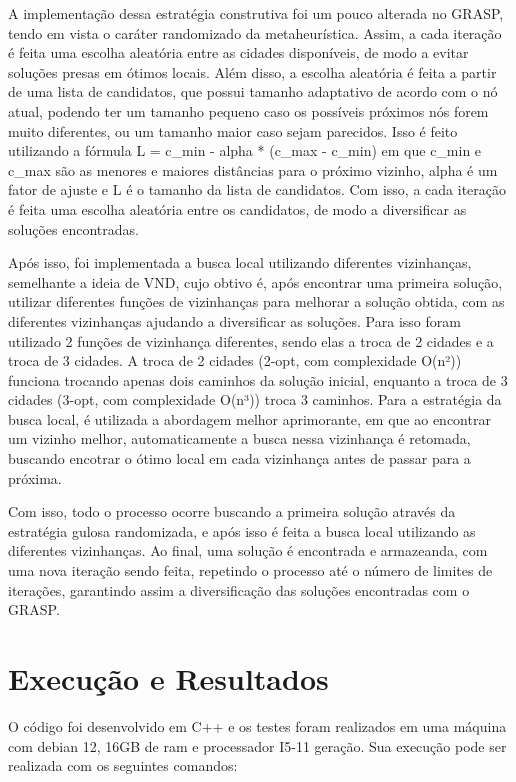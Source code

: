 \documentclass[10pt]{extarticle} %
\begin{document}
A implementação dessa estratégia construtiva foi um pouco alterada no GRASP, tendo em vista o caráter randomizado da metaheurística. Assim, a cada iteração é feita uma escolha aleatória entre as cidades disponíveis, de modo a evitar soluções presas em ótimos locais. Além disso, a escolha aleatória é feita a partir de uma lista de candidatos, que possui tamanho adaptativo de acordo com o nó atual, podendo ter um tamanho pequeno caso os possíveis próximos nós forem muito diferentes, ou um tamanho maior caso sejam parecidos. Isso é feito utilizando a fórmula L = c\_min - alpha * (c\_max - c\_min) em que c\_min e c\_max são as menores e maiores distâncias para o próximo vizinho, alpha é um fator de ajuste e L é o tamanho da lista de candidatos. Com isso, a cada iteração é feita uma escolha aleatória entre os candidatos, de modo a diversificar as soluções encontradas.

Após isso, foi implementada a busca local utilizando diferentes vizinhanças, semelhante a ideia de VND, cujo obtivo é, após encontrar uma primeira solução, utilizar diferentes funções de vizinhanças para melhorar a solução obtida, com as diferentes vizinhanças ajudando a diversificar as soluções. Para isso foram utilizado 2 funções de vizinhança diferentes, sendo elas a troca de 2 cidades e a troca de 3 cidades. A troca de 2 cidades (2-opt, com complexidade O(n²)) funciona trocando apenas dois caminhos da solução inicial, enquanto a troca de 3 cidades (3-opt, com complexidade O(n³)) troca 3 caminhos. Para a estratégia da busca local, é utilizada a abordagem melhor aprimorante, em que ao encontrar um vizinho melhor, automaticamente a busca nessa vizinhança é retomada, buscando encotrar o ótimo local em cada vizinhança antes de passar para a próxima. 

Com isso, todo o processo ocorre buscando a primeira solução através da estratégia gulosa randomizada, e após isso é feita a busca local utilizando as diferentes vizinhanças. Ao final, uma solução é encontrada e armazeanda, com uma nova iteração sendo feita, repetindo o processo até o número de limites de iterações, garantindo assim a diversificação das soluções encontradas com o GRASP.

\section{Execução e Resultados}

O código foi desenvolvido em C++ e os testes foram realizados em uma máquina com debian 12, 16GB de ram e processador I5-11 geração. Sua execução pode ser realizada com os seguintes comandos:
\end{document}
